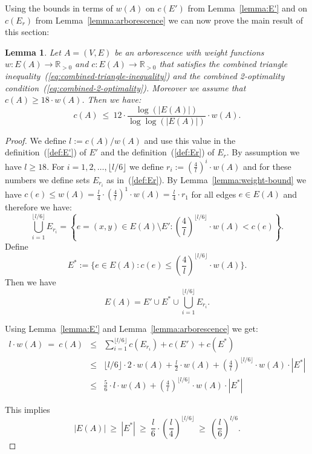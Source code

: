 \documentclass[a4paper, 11pt]{article}
\newtheorem{lemma}[theorem]{Lemma}
\def\blue#1{#1}
\begin{document}
Using the bounds in terms of $w(A)$ on $c(E')$  from Lemma~\ref{lemma:E'} and on $c(E_r)$ from Lemma~\ref{lemma:arborescence}
we can now prove the main result of this section:

\begin{lemma}
Let $A=(V,E)$ be an arborescence with weight functions $w:E(A)\to \mathbb{R}_{> 0}$ and $c:E(A)\to \mathbb{R}_{> 0}$
that satisfies the combined triangle inequality~(\ref{eq:combined-triangle-inequality})
and the combined 2-optimality condition~(\ref{eq:combined-2-optimality}).
Moreover we assume that $c(A) \ge 18 \cdot w(A)$.
Then we have: \[c(A) ~\le~ 12\cdot \frac{\log(|E(A)|)}{\log \log (|E(A)|)}\cdot w(A) .\]
\label{lemma:mainlemma}
\end{lemma}

\begin{proof}
We define $l := c(A) / w(A)$ and use this value in the definition~(\ref{def:E'}) of $E'$ and the definition~(\ref{def:Er})
of $E_r$. By assumption we have $l \ge 18$.
For $i= 1, 2, \ldots, \lfloor l/6 \rfloor$ we define $r_i := \left( \frac{4}{l}\right)^i\cdot w(A)$ and for these numbers we 
define sets $E_{r_i}$ as in~(\ref{def:Er}). By Lemma~\ref{lemma:weight-bound} we have  
$c(e) \le w(A) = \frac{l}{4} \cdot \left(\frac{4}{l}\right)^1\cdot w(A) = \frac{l}{4}\cdot r_1$ \blue{for all edges $e\in E(A)$} and therefore we have:
\[\bigcup_{i=1}^{\lfloor l/6 \rfloor} E_{r_i} = \left\{ e=(x,y)\in E(A)\setminus E': \left(\frac{4}{l}\right)^{\lfloor l/6 \rfloor} \cdot w(A) < c(e)\right\}.\]
Define \[E^* := \{e\in E(A): c(e) \le \left(\frac{4}{l}\right)^{\lfloor l/6 \rfloor} \cdot w(A)\} .\]
Then we have \[E(A) = E' \cup E^* \cup \bigcup_{i=1}^{\lfloor l/6 \rfloor} E_{r_i}.\] 

Using Lemma~\ref{lemma:E'} and Lemma~\ref{lemma:arborescence} we get:
\begin{eqnarray*}
l\cdot w(A) ~ = ~ c(A) & \le & \sum_{i=1}^{\lfloor l/6 \rfloor} c(E_{r_i}) + c(E') + c(E^*) \\
                       & \le & {\lfloor l/6 \rfloor} \cdot 2\cdot w(A) + \frac{l}{2} \cdot w(A) + \left(\frac{4}{l}\right)^{\lfloor l/6 \rfloor} \cdot w(A) \cdot|E^*| \\
                       & \le &  \frac{5}{6} \cdot l \cdot w(A) + \left(\frac{4}{l}\right)^{\lfloor l/6 \rfloor} \cdot w(A) \cdot|E^*|
\end{eqnarray*}


This implies 
\begin{equation}
|E(A)| ~\ge~ |E^*| ~\ge~ \frac{l}{6} \cdot \left(\frac{l}{4}\right)^{\lfloor l/6 \rfloor} ~\ge~ \left(\frac{l}{6}\right)^{l/6} .
\label{eq:sizeE}
\end{equation}


\end{proof}
\end{document}
